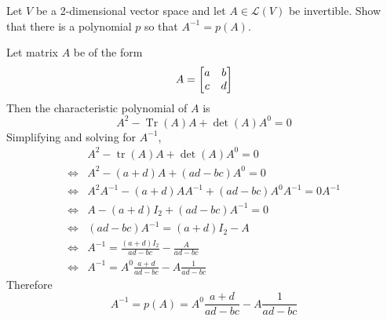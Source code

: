 Let $V$ be a 2-dimensional vector space and let $A \in \mathcal{L}(V)$ be invertible.  Show that there is a polynomial $p$ so that $A^{-1} = p(A)$.
\begin{mybox}
Let matrix $A$ be of the form
$$A = \begin{bmatrix}{a} & {b}\\{c}&{d}\end{bmatrix}$$
Then the characteristic polynomial of $A$ is
$$A^2 - \operatorname{Tr}(A)A + \det(A)A^0 = 0$$
Simplifying and solving for $A^{-1}$,
\begin{align*}
    &A^2 - \operatorname{tr}(A)A + \det(A)A^0 = 0\\
    \iff & A^2 - (a + d)A + (ad-bc)A^0 = 0\\
    \iff & A^2A^{-1} - (a+d)AA^{-1} + (ad-bc)A^0A^{-1} = 0A^{-1}\\
    \iff & A - (a+d)I_2 + (ad-bc)A^{-1} = 0\\
    \iff & (ad-bc)A^{-1} = (a+d)I_2 - A\\
    \iff & A^{-1} = \frac{(a+d)I_2}{ad-bc} - \frac{A}{ad-bc}\\
    \iff & A^{-1} = A^0\frac{a+d}{ad-bc} - A\frac{1}{ad-bc}
\end{align*}
Therefore
$$A^{-1} = p(A) = A^0\frac{a+d}{ad-bc} - A\frac{1}{ad-bc}$$
\end{mybox}